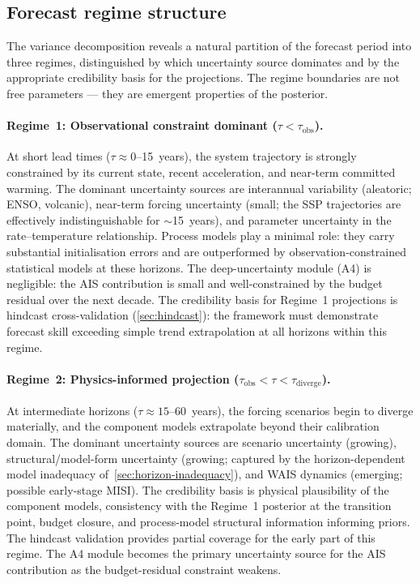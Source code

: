 \documentclass[11pt]{article}
\begin{document}
\subsection{Forecast regime structure}
\label{sec:forecast-regimes}

The variance decomposition reveals a natural partition of the forecast period into three regimes, distinguished by which uncertainty source dominates and by the appropriate credibility basis for the projections.  The regime boundaries are not free parameters --- they are emergent properties of the posterior.

\paragraph{Regime~1: Observational constraint dominant ($\tau < \tau_{\text{obs}}$).}
At short lead times ($\tau \approx 0$--15~years), the system trajectory is strongly constrained by its current state, recent acceleration, and near-term committed warming.  The dominant uncertainty sources are interannual variability (aleatoric; ENSO, volcanic), near-term forcing uncertainty (small; the SSP trajectories are effectively indistinguishable for $\sim$15~years), and parameter uncertainty in the rate--temperature relationship.  Process models play a minimal role: they carry substantial initialisation errors and are outperformed by observation-constrained statistical models at these horizons.  The deep-uncertainty module (A4) is negligible: the AIS contribution is small and well-constrained by the budget residual over the next decade.  The credibility basis for Regime~1 projections is hindcast cross-validation (\cref{sec:hindcast}): the framework must demonstrate forecast skill exceeding simple trend extrapolation at all horizons within this regime.

\paragraph{Regime~2: Physics-informed projection ($\tau_{\text{obs}} < \tau < \tau_{\text{diverge}}$).}
At intermediate horizons ($\tau \approx 15$--60~years), the forcing scenarios begin to diverge materially, and the component models extrapolate beyond their calibration domain.  The dominant uncertainty sources are scenario uncertainty (growing), structural/model-form uncertainty (growing; captured by the horizon-dependent model inadequacy of~\cref{sec:horizon-inadequacy}), and WAIS dynamics (emerging; possible early-stage MISI).  The credibility basis is physical plausibility of the component models, consistency with the Regime~1 posterior at the transition point, budget closure, and process-model structural information informing priors.  The hindcast validation provides partial coverage for the early part of this regime.  The A4 module becomes the primary uncertainty source for the AIS contribution as the budget-residual constraint weakens.
\end{document}
